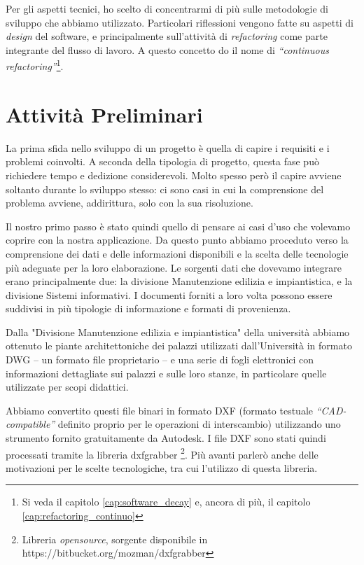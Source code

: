 \documentclass[12pt]{report}
\begin{document}
Per gli aspetti tecnici, ho scelto di concentrarmi di più sulle
metodologie di sviluppo che abbiamo utilizzato. 
Particolari riflessioni vengono fatte su
aspetti di \textit{design} del software, e principalmente sull'attività
di \textit{refactoring} come parte integrante del flusso di lavoro.
A questo concetto do il nome di \textit{“continuous refactoring”}\footnote{Si veda il capitolo \ref{cap:software_decay} e, ancora di più, il capitolo \ref{cap:refactoring_continuo}}.


% 
% 
\chapter{Attività Preliminari}
\label{cap:attr_preliminari} 

La prima sfida nello sviluppo di un progetto è quella di capire i
requisiti e i problemi coinvolti. A seconda della tipologia di
progetto, questa fase può richiedere tempo e dedizione considerevoli. Molto
spesso però il capire avviene soltanto durante lo sviluppo stesso:
ci sono  casi in cui la comprensione del problema avviene, addirittura, solo
con la sua risoluzione.

Il nostro primo passo è stato quindi quello di pensare ai casi d'uso che
volevamo coprire con la nostra applicazione. Da questo punto abbiamo
proceduto verso la comprensione dei dati e delle informazioni
disponibili e la scelta delle tecnologie più adeguate per la loro
elaborazione. Le sorgenti dati che dovevamo integrare erano principalmente due: 
la divisione Manutenzione edilizia e impiantistica, e la divisione Sistemi 
informativi. I documenti forniti a loro volta possono essere suddivisi in 
più tipologie di informazione e
formati di provenienza.

Dalla "Divisione Manutenzione edilizia e impiantistica" della università abbiamo ottenuto le piante
architettoniche dei palazzi utilizzati dall'Università in formato DWG
-- un formato file proprietario -- e una serie di fogli elettronici con
informazioni dettagliate sui palazzi e sulle loro stanze, in particolare
quelle utilizzate per scopi didattici.

Abbiamo convertito questi file binari in formato DXF (formato testuale
\textit{``CAD-compatible''} definito proprio per le operazioni di interscambio) 
utilizzando uno strumento fornito gratuitamente da Autodesk. I file DXF sono 
stati quindi processati tramite la libreria dxfgrabber \footnote{Libreria \textit{opensource},
sorgente disponibile in https://bitbucket.org/mozman/dxfgrabber}. 
Più avanti parlerò anche delle motivazioni per le scelte
tecnologiche, tra cui l'utilizzo di questa libreria.
\end{document}
